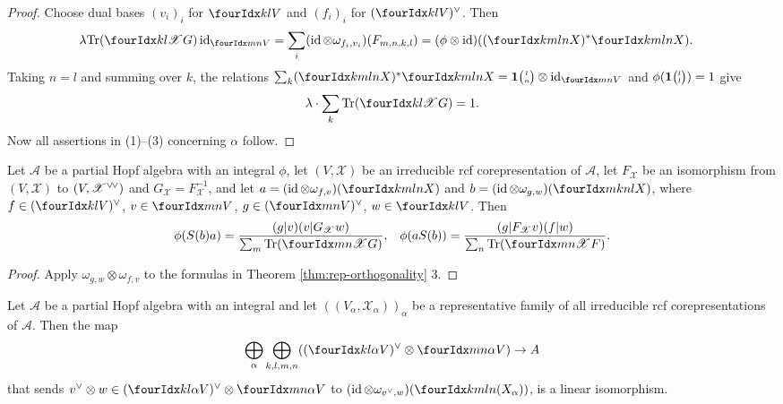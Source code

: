 \begin{proof}
  Choose dual  bases
  $(v_{i})_{i}$ for $\Gru{V}{k}{l}$ and $(f_{i})_{i}$ for  $\dual{(\Gru{V}{k}{l})}$. Then
  \begin{align*}
    \lambda   \Tr( \Gr{G}{k}{l}{}{\mathscr{X}}) \id_{\Gru{V}{m}{n}}
 &= \sum_{i} (\id \otimes
    \omega_{f_{i},v_{i}})(F_{m,n,k,l}) = (\phi \otimes
    \id)((\Gr{X}{k}{l}{m}{n})^{*} \Gr{X}{k}{l}{m}{n}).
  \end{align*}
  Taking $n=l$ and summing over $k$, the relations $\sum_{k}
  (\Gr{X}{k}{l}{m}{n})^{*} \Gr{X}{k}{l}{m}{n} = \UnitC{l}{n}
  \otimes \id_{\Gru{V}{m}{n}}$ and
  $\phi(\mathbf{1}{\tiny {\begin{pmatrix} l\\l\end{pmatrix}}})=1$ give
\begin{align*}
\lambda \cdot  \sum_{k} \Tr(\Gr{G}{k}{l}{}{\mathscr{X}}) = 1.
\end{align*}
Now all assertions in (1)--(3) concerning $\alpha$ follow.
\end{proof}
\begin{Cor}\label{CorOrth}
  Let $\mathscr{A}$ be a partial Hopf algebra with an integral $\phi$, let
  $(V,\mathscr{X})$ be an irreducible rcf corepresentation of
  $\mathscr{A}$, let $F_{\mathscr{X}}$ be an isomorphism from
  $(V,\mathscr{X})$ to $(V,\mathscr{X}^{\vee}{}\!^{\vee})$ and
  $G_{\mathscr{X}}=F^{-1}_{{\mathscr{X}}}$, and let $a=(\id \otimes
  \omega_{f,v})(\Gr{X}{k}{l}{m}{n})$ and $b=(\id \otimes
  \omega_{g,w})(\Gr{X}{m}{n}{k}{l})$, where 
  $f \in   \dual{(\Gru{V}{k}{l})}$, $v \in\Gru{V}{m}{n}$, $g \in
  \dual{(\Gru{V}{m}{n})}$, $w \in  \Gru{V}{k}{l}$.  Then
\begin{align*}
  \phi(S(b)a) &= \frac{(g|v)(v|G_{\mathscr{X}}w)}{\sum_{m}
    \Tr(\Gr{G}{m}{n}{}{\mathscr{X}})}, & \phi(aS(b)) = \frac{(g|F_{\mathscr{X}}v)(f|w)}{\sum_{n}
    \Tr(\Gr{F}{m}{n}{}{\mathscr{X}})}.
\end{align*}
\end{Cor}
\begin{proof}
Apply $\omega_{g,w} \otimes
    \omega_{f,v}$ to the formulas in  Theorem
    \ref{thm:rep-orthogonality} 3.
\end{proof}
\begin{Cor} \label{cor:rep-pw}
  Let $\mathscr{A}$ be a partial Hopf algebra with an integral and let
  $((V_{\alpha},\mathscr{X}_{\alpha}))_{\alpha}$ be a representative
  family of all irreducible rcf corepresentations of
  $\mathscr{A}$. Then the map
  \begin{align*}
    \bigoplus_{\alpha} \bigoplus_{k,l,m,n}
    (\dual{(\Gr{V}{k}{l}{}{\alpha})} \otimes
    \Gr{V}{m}{n}{}{\alpha}) \to A
  \end{align*}
  that sends $\dual{v} \otimes w \in
  \dual{(\Gr{V}{k}{l}{}{\alpha})} \otimes
  \Gr{V}{m}{n}{}{\alpha}$ to $ (\id \otimes
  \omega_{\dual{v},w})(\Gr{(X_{\alpha})}{k}{l}{m}{n})$,
  is a linear isomorphism. 
\end{Cor}
